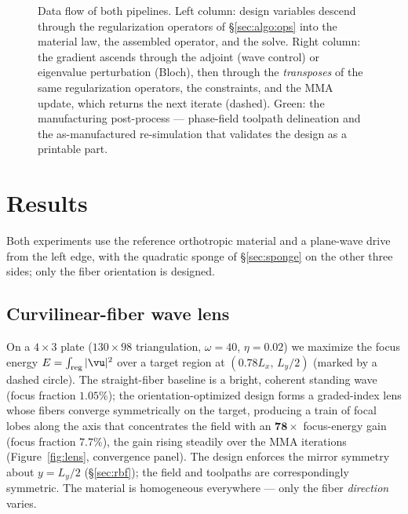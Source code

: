 \documentclass[11pt]{article}
\begin{document}
\begin{figure}[H]
\caption{Data flow of both pipelines. Left column: design variables descend
through the regularization operators of \S\ref{sec:algo:ops} into the material
law, the assembled operator, and the solve. Right column: the gradient ascends
through the adjoint (wave control) or eigenvalue perturbation (Bloch), then
through the \emph{transposes} of the same regularization operators, the
constraints, and the MMA update, which returns the next iterate (dashed). Green:
the manufacturing post-process --- phase-field toolpath delineation and the
as-manufactured re-simulation that validates the design as a printable part.}
\label{fig:flow}
\end{figure}

\section{Results}
\label{sec:results}
Both experiments use the reference orthotropic material and a plane-wave drive
from the left edge, with the quadratic sponge of \S\ref{sec:sponge} on the other
three sides; only the fiber orientation is designed.

\subsection{Curvilinear-fiber wave lens}
On a $4\times3$ plate ($130\times98$ triangulation, $\omega=40$, $\eta=0.02$) we
maximize the focus energy $E=\int_{\rm reg}|\vu|^2$ over a target region at
$(0.78L_x,\,L_y/2)$ (marked by a dashed circle). The straight-fiber baseline is a bright, coherent standing
wave (focus fraction $1.05\%$); the orientation-optimized design forms a
graded-index lens whose fibers converge symmetrically on the target, producing a
train of focal lobes along the axis that concentrates the field with an
$\mathbf{78\times}$ focus-energy gain (focus fraction $7.7\%$), the gain rising
steadily over the MMA iterations (Figure~\ref{fig:lens}, convergence panel). The
design enforces the
mirror symmetry about $y=L_y/2$ (\S\ref{sec:rbf}); the field and toolpaths are
correspondingly symmetric. The material is homogeneous everywhere --- only the
fiber \emph{direction} varies.
\end{document}

